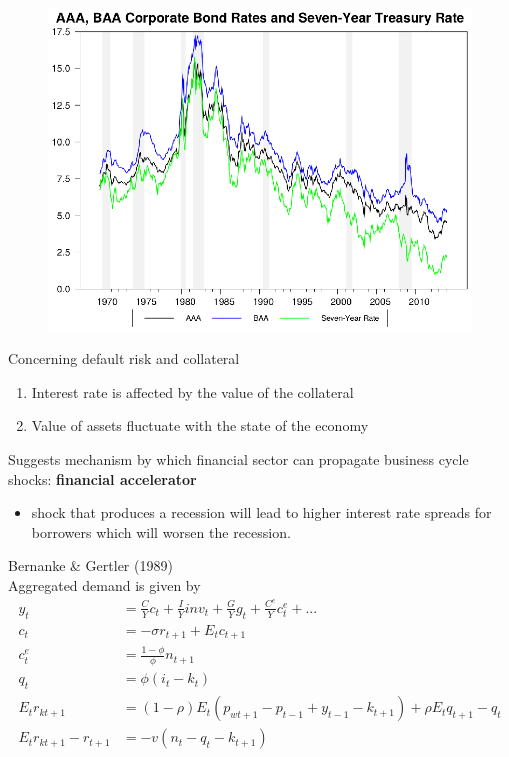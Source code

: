 \documentclass{beamer}
\begin{document}
\begin{frame}
  \begin{figure}
    \includegraphics{bond_rates.eps}
  \end{figure}
\end{frame}

\begin{frame}
 Concerning default risk and collateral 
\begin{enumerate}
  \item Interest rate is affected by the value of the collateral
  \item Value of assets fluctuate with the state of the economy
\end{enumerate}
 \medskip
 Suggests mechanism by which financial sector can propagate business cycle shocks: \textbf{financial accelerator}
 \begin{itemize}
   \item shock that produces a recession will lead to higher interest rate spreads for borrowers which will worsen the recession. 
 \end{itemize}
\end{frame}

\begin{frame}
Bernanke \& Gertler (1989) \\
  Aggregated demand is given by
\begin{align}
  y_t &= \frac{C}{Y}c_t + \frac{I}{Y}inv_t + \frac{G}{Y}g_t + \frac{C^e}{Y}c^e_t+...\\
  c_t &= -\sigma r_{t+1} + E_tc_{t+1}\\
  c^e_t &= \frac{1-\phi}{\phi}n_{t+1}\\
  q_t &= \phi(i_t-k_t)  \\
  E_tr_{kt+1} &= (1-\rho)E_t(p_{wt+1}-p_{t-1} + y_{t-1} - k_{t+1}) + \rho E_tq_{t+1} -q_t\\
  E_tr_{kt+1} - r_{t+1} &= -v(n_t -q_t -k_{t+1})  
\end{align}
\end{frame}
\end{document}
